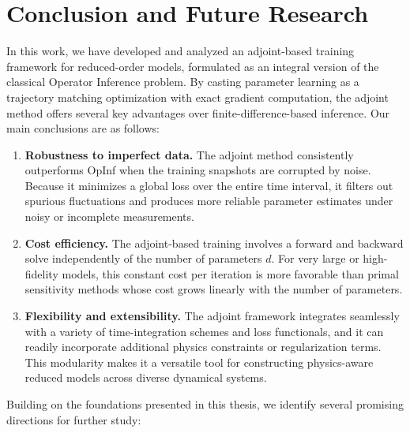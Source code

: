 
\chapter{Conclusion and Future Research}
\label{chap:conclusion}

In this work, we have developed and analyzed an adjoint-based training framework for reduced-order models, formulated as an integral version of the classical Operator Inference problem.  By casting parameter learning as a trajectory matching optimization with exact gradient computation, the adjoint method offers several key advantages over finite-difference-based inference.  Our main conclusions are as follows:

\begin{enumerate}[label=(\roman*)]
  \item \textbf{Robustness to imperfect data.}  
    The adjoint method consistently outperforms OpInf when the training snapshots are corrupted by noise. Because it minimizes a global loss over the entire time interval, it filters out spurious fluctuations and produces more reliable parameter estimates under noisy or incomplete measurements.

  \item \textbf{Cost efficiency.}  
    The adjoint-based training involves a forward and backward solve independently of the number of parameters $d$. For very large or high-fidelity models, this constant cost per iteration is more favorable than primal sensitivity methods whose cost grows linearly with the number of parameters.

  \item \textbf{Flexibility and extensibility.}  
    The adjoint framework integrates seamlessly with a variety of time-integration schemes and loss functionals, and it can readily incorporate additional physics constraints or regularization terms. This modularity makes it a versatile tool for constructing physics-aware reduced models across diverse dynamical systems.
\end{enumerate}

Building on the foundations presented in this thesis, we identify several promising directions for further study:

